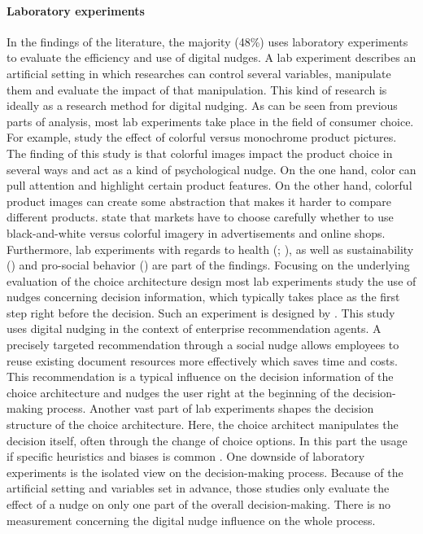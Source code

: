 \paragraph{Laboratory experiments}
In the findings of the literature, the majority (48\%) uses laboratory experiments to evaluate the efficiency and use of digital nudges. A lab experiment describes an artificial setting in which researches can control several variables, manipulate them and evaluate the impact of that manipulation. This kind of research is ideally as a research method for digital nudging. As can be seen from previous parts of analysis, most lab experiments take place in the field of consumer choice. For example, \cite{lee_monochrome_2014} study the effect of colorful versus monochrome product pictures. The finding of this study is that colorful images impact the product choice in several ways and act as a kind of psychological nudge.
On the one hand, color can pull attention and highlight certain product features. On the other hand, colorful product images can create some abstraction that makes it harder to compare different products. \cite{lee_monochrome_2014} state that markets have to choose carefully whether to use black-and-white versus colorful imagery in advertisements and online shops.
Furthermore, lab experiments with regards to health (\cite{laran_nonconscious_2018}; \cite{langley_should_2015}), as well as sustainability (\cite{bruns_can_2018}) and pro-social behavior (\cite{zarghamee_nudging_2017}) are part of the findings. Focusing on the underlying evaluation of the choice architecture design most lab experiments study the use of nudges concerning decision information, which typically takes place as the first step right before the decision. Such an experiment is designed by \cite{kretzer_designing_2018}. This study uses digital nudging in the context of enterprise recommendation agents. A precisely targeted recommendation through a social nudge allows employees to reuse existing document resources more effectively which saves time and costs. This recommendation is a typical influence on the decision information of the choice architecture and nudges the user right at the beginning of the decision-making process. 
Another vast part of lab experiments shapes the decision structure of the choice architecture. Here, the choice architect manipulates the decision itself, often through the change of choice options. In this part the usage if specific heuristics and biases is common \cite{tversky_judgment_1974}.
One downside of laboratory experiments is the isolated view on the decision-making process. Because of the artificial setting and variables set in advance, those studies only evaluate the effect of a nudge on only one part of the overall decision-making. There is no measurement concerning the digital nudge influence on the whole process.
 
